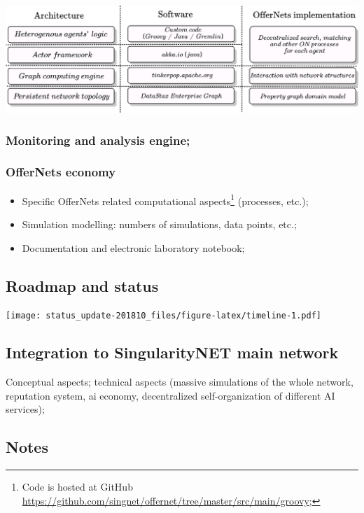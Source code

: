 \documentclass[]{article}
\providecommand{\tightlist}{%
  \setlength{\itemsep}{0pt}\setlength{\parskip}{0pt}}
\let\rmarkdownfootnote\footnote%
\def\footnote{\protect\rmarkdownfootnote}
\begin{document}
\includegraphics{pictures/stack.png}

\hypertarget{monitoring-and-analysis-engine}{%
\subsubsection{Monitoring and analysis
engine;}\label{monitoring-and-analysis-engine}}

\hypertarget{offernets-economy}{%
\subsubsection{OfferNets economy}\label{offernets-economy}}

\begin{itemize}
\tightlist
\item
  Specific OfferNets related computational aspects\footnote{Code is
    hosted at GitHub
    \url{https://github.com/singnet/offernet/tree/master/src/main/groovy};}
  (processes, etc.);
\item
  Simulation modelling: numbers of simulations, data points, etc.;
\item
  Documentation and electronic laboratory notebook;
\end{itemize}

\hypertarget{roadmap-and-status}{%
\subsection{Roadmap and status}\label{roadmap-and-status}}

\texttt{[image: status\_update-201810\_files/figure-latex/timeline-1.pdf]}

\hypertarget{integration-to-singularitynet-main-network}{%
\subsection{Integration to SingularityNET main
network}\label{integration-to-singularitynet-main-network}}

Conceptual aspects; technical aspects (massive simulations of the whole
network, reputation system, ai economy, decentralized self-organization
of different AI services);

\hypertarget{notes}{%
\subsection{Notes}\label{notes}}
\end{document}
